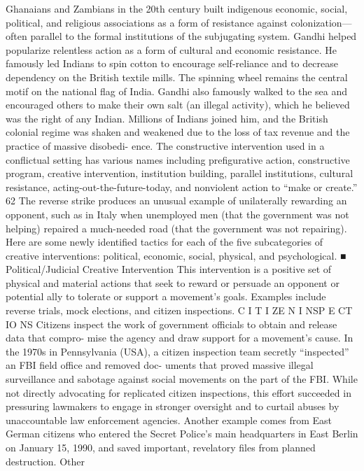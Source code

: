 \documentclass[twoside,a4paper,12pt,fleqn,openany]{extbook}
\begin{document}
Ghanaians and Zambians in the 20th century built indigenous economic, social, political, and
religious associations as a form of resistance against colonization—often parallel to the formal
institutions of the subjugating system. Gandhi helped popularize relentless action as a form
of cultural and economic resistance. He famously led Indians to spin cotton to encourage
self-reliance and to decrease dependency on the British textile mills. The spinning wheel
remains the central motif on the national flag of India. Gandhi also famously walked to the
sea and encouraged others to make their own salt (an illegal activity), which he believed was
the right of any Indian. Millions of Indians joined him, and the British colonial regime was
shaken and weakened due to the loss of tax revenue and the practice of massive disobedi-
ence. The constructive intervention used in a conflictual setting has various names including
prefigurative action, constructive program, creative intervention, institution building, parallel
institutions, cultural resistance, acting-out-the-future-today, and nonviolent action to “make
or create.”
62
The reverse strike produces an unusual example of unilaterally rewarding an opponent,
such as in Italy when unemployed men (that the government was not helping) repaired a
much-needed road (that the government was not repairing).
Here are some newly identified tactics for each of the five subcategories of creative
interventions: political, economic, social, physical, and psychological.
■ Political/Judicial Creative Intervention
This intervention is a positive set of physical and material actions that seek to reward or
persuade an opponent or potential ally to tolerate or support a movement’s goals. Examples
include reverse trials, mock elections, and citizen inspections.
C I T I ZE N I NSP E CT IO NS
Citizens inspect the work of government officials to obtain and release data that compro-
mise the agency and draw support for a movement’s cause. In the 1970s in Pennsylvania
(USA), a citizen inspection team secretly “inspected” an FBI field office and removed doc-
uments that proved massive illegal surveillance and sabotage against social movements
on the part of the FBI. While not directly advocating for replicated citizen inspections, this
effort succeeded in pressuring lawmakers to engage in stronger oversight and to curtail
abuses by unaccountable law enforcement agencies. Another example comes from East
German citizens who entered the Secret Police’s main headquarters in East Berlin on
January 15, 1990, and saved important, revelatory files from planned destruction. Other
\end{document}
